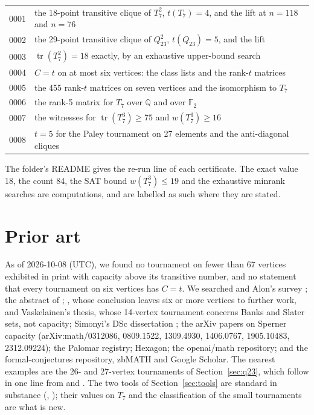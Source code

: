 \documentclass[11pt]{article}
\theoremstyle{definition}
\theoremstyle{remark}
\newcommand{\F}{\mathbb{F}}
\newcommand{\Q}{\mathbb{Q}}
\newcommand{\tr}{\operatorname{tr}}
\begin{document}
\medskip
\noindent
\begin{tabular}{@{}lp{}@{}}
0001 & the 18-point transitive clique of $T_7^2$, $t(T_7) = 4$, and the lift at $n = 118$ and $n = 76$\\
0002 & the 29-point transitive clique of $Q_{23}^2$, $t(Q_{23}) = 5$, and the lift\\
0003 & $\tr(T_7^2) = 18$ exactly, by an exhaustive upper-bound search\\
0004 & $C = t$ on at most six vertices: the class lists and the rank-$t$ matrices\\
0005 & the 455 rank-$t$ matrices on seven vertices and the isomorphism to $T_7$\\
0006 & the rank-5 matrix for $T_7$ over $\Q$ and over $\F_2$\\
0007 & the witnesses for $\tr(T_7^3) \ge 75$ and $w(T_7^3) \ge 16$\\
0008 & $t = 5$ for the Paley tournament on 27 elements and the anti-diagonal cliques
\end{tabular}

\medskip
The folder's README gives the re-run line of each certificate. The exact value 18, the
count 84, the SAT bound $w(T_7^3) \le 19$ and the exhaustive minrank searches are computations, and
are labelled as such where they are stated.

\section{Prior art}\label{sec:prior}

As of 2026-10-08 (UTC), we found no tournament on fewer than 67 vertices exhibited in print with
capacity above its transitive number, and no statement that every tournament on six vertices has
$C = t$. We searched \cite{alon} and Alon's survey \cite{alonsurvey}; the abstract of \cite{korner};
\cite{kov}, whose conclusion leaves six or more vertices to further work, and Vaskelainen's thesis,
whose 14-vertex tournament concerns Banks and Slater sets, not capacity; Simonyi's DSc dissertation
\cite{simonyi}; the arXiv papers on Sperner capacity (arXiv:math/0312086, 0809.1522, 1309.4930,
1406.0767, 1905.10483, 2312.09224); the Palomar registry; Hexagon; the openai/math repository; and
the formal-conjectures repository, zbMATH and Google Scholar. The nearest examples are the 26- and
27-vertex tournaments of Section~\ref{sec:q23}, which follow in one line from \cite{alon} and
\cite{sanchez}. The two tools of Section~\ref{sec:tools} are standard in substance (\cite{ss},
\cite{kov}); their values on $T_7$ and the classification of the small tournaments are what is new.
\end{document}
